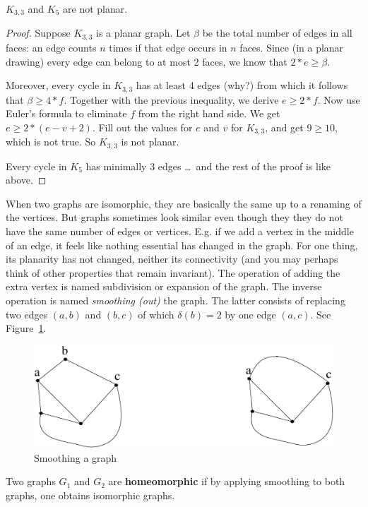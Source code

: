  \begin{theorem}
$K_{3,3}$ and $K_{5}$ are not planar.
\end{theorem}
\begin{proof}
Suppose $K_{3,3}$ is a planar graph. Let $\beta$ be the total number
of edges in all faces: an edge counts $n$ times if that edge occurs in
$n$ faces. Since (in a planar drawing) every edge can belong to at most 2
faces, we know that $2*e \geq \beta$.

Moreover, every cycle in $K_{3,3}$ has at least 4 edges (why?) from
which it follows that $\beta \geq 4*f$. Together with the previous
inequality, we derive $e \geq 2*f$. Now use Euler's formula to
eliminate $f$ from the right hand side. We get $e \geq 2*(e-v+2)$.
Fill out the values for $e$ and $v$ for $K_{3,3}$, and get $9 \geq
10$, which is not true. So $K_{3,3}$ is not planar.

Every cycle in $K_{5}$ has minimally 3 edges \ldots\ and the rest of
the proof is like above.
\end{proof}


When two graphs are isomorphic, they are basically the same up to a
renaming of the vertices. But graphs sometimes look similar even
though they they do not have the same number of edges or
vertices. E.g. if we add a vertex in the middle of an edge, it feels
like nothing essential has changed in the graph. For one thing, its
planarity has not changed, neither its connectivity (and you may
perhaps think of other properties that remain invariant). The
operation of adding the extra vertex is named subdivision or expansion
of the graph. The inverse operation is named {\em smoothing (out)} the
graph. The latter consists of replacing two edges $(a,b)$ and $(b,c)$
of which $\delta(b) = 2$ by one edge $(a,c)$. See Figure~\ref{rij1}.



\begin{figure}[ht]
\begin{center}
\includegraphics[width=0.4\linewidth,keepaspectratio]{rij1}
\end{center}
\caption{Smoothing a graph \label{rij1}}
\end{figure}

\begin{definition}
  \textup{Two graphs $G_{1}$ and $G_{2}$ are \textbf{homeomorphic} if
by applying smoothing to both graphs, one obtains isomorphic graphs.}
\end{definition}

